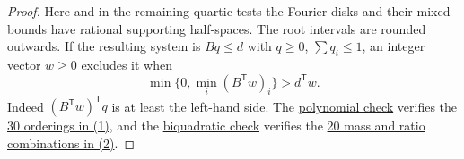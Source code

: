 \documentclass[11pt,reqno]{amsart}
\newcommand{\codecheck}[2]{\href{https://github.com/sebastienpalcoux/grothendieck-ring-classification/blob/d5750105bb5758f3ad38d2e5464dfcc12c019816/supplements/rank6/sphericality/#1}{#2}}
\theoremstyle{remark}\newtheorem{remark}[theorem]{Remark}
\numberwithin{equation}{section}
\begin{document}
\begin{proof}
Here and in the remaining quartic tests the Fourier disks and their
mixed bounds have rational supporting half-spaces. The root intervals
are rounded outwards. If the resulting system is $Bq\le d$ with
$q\ge0$, $\sum q_i\le1$, an integer vector $w\ge0$ excludes it when
\begin{equation}\label{eq:quartic-separator}
 \min\{0,\min_i(B^{\mathsf T}w)_i\}>d^{\mathsf T}w .
\end{equation}
Indeed $(B^{\mathsf T}w)^{\mathsf T}q$ is at least the left-hand side.
The \codecheck{generic_quartic/verify_quartic_fields.py}{polynomial check}
verifies the \codecheck{generic_quartic/quartic_field_duals.json}{30 orderings
in (1)}, and the \codecheck{generic_quartic/golden_biquadratic.py}{biquadratic
check} verifies the \codecheck{generic_quartic/golden_biquadratic_duals.json}{20
mass and ratio combinations in (2)}.
\end{proof}
\end{document}
